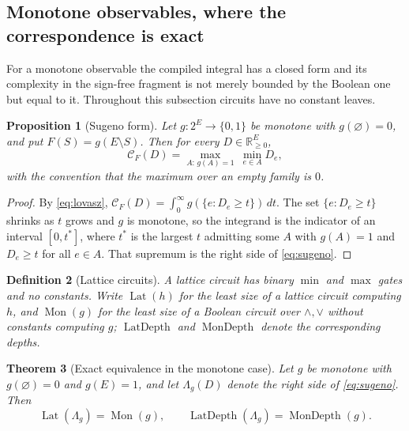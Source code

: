 \documentclass[11pt]{article}
\newtheorem{theorem}{Theorem}[section]
\newtheorem{proposition}[theorem]{Proposition}
\newtheorem{definition}[theorem]{Definition}
\begin{document}
\subsection{Monotone observables, where the correspondence is exact}
\label{sec:monotone}

For a monotone observable the compiled integral has a closed form and its
complexity in the sign-free fragment is not merely bounded by the Boolean one
but equal to it.  Throughout this subsection circuits have no constant leaves.

\begin{proposition}[Sugeno form]
\label{prop:sugeno}
Let $g\colon2^{E}\to\{0,1\}$ be monotone with $g(\varnothing)=0$, and put
$F(S)=g(E\setminus S)$.  Then for every $D\in\mathbb R_{\ge0}^{E}$,
\begin{equation}
  \mathcal C_F(D)=\max_{A:\,g(A)=1}\ \min_{e\in A}D_e ,
  \label{eq:sugeno}
\end{equation}
with the convention that the maximum over an empty family is $0$.
\end{proposition}

\begin{proof}
By \eqref{eq:lovasz}, $\mathcal C_F(D)=\int_0^{\infty}g(\{e:D_e\ge t\})\,dt$.
The set $\{e:D_e\ge t\}$ shrinks as $t$ grows and $g$ is monotone, so the
integrand is the indicator of an interval $[0,t^{*}]$, where $t^{*}$ is the
largest $t$ admitting some $A$ with $g(A)=1$ and $D_e\ge t$ for all $e\in A$.
That supremum is the right side of \eqref{eq:sugeno}.
\end{proof}

\begin{definition}[Lattice circuits]
\label{def:lattice}
A \emph{lattice circuit} has binary $\min$ and $\max$ gates and no constants.
Write $\operatorname{Lat}(h)$ for the least size of a lattice circuit computing
$h$, and $\operatorname{Mon}(g)$ for the least size of a Boolean circuit over
$\wedge,\vee$ without constants computing $g$; $\operatorname{LatDepth}$ and
$\operatorname{MonDepth}$ denote the corresponding depths.
\end{definition}

\begin{theorem}[Exact equivalence in the monotone case]
\label{thm:lattice}
Let $g$ be monotone with $g(\varnothing)=0$ and $g(E)=1$, and let
$\Lambda_g(D)$ denote the right side of \eqref{eq:sugeno}.  Then
\[
  \operatorname{Lat}(\Lambda_g)=\operatorname{Mon}(g),
  \qquad
  \operatorname{LatDepth}(\Lambda_g)=\operatorname{MonDepth}(g).
\]
\end{theorem}
\end{document}
